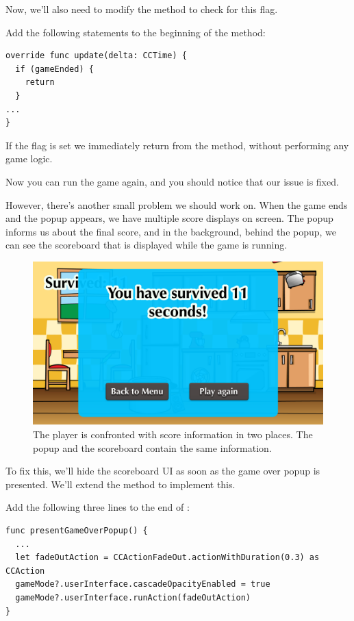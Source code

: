 Now, we'll also need to modify the  method to check for this
flag.
\begin{leftbar}
Add the following statements to the beginning of the 
method:
\begin{lstlisting}
override func update(delta: CCTime) {
  if (gameEnded) {
    return
  }
...
}
\end{lstlisting}
\end{leftbar}
If the  flag is set we immediately return from the
 method, without performing any game logic.

Now you can run the game again, and you should notice that our issue is fixed.

However, there's another small problem we should work on. When the game ends and
the popup appears, we have multiple score displays on screen. The popup informs
us about the final score, and in the background, behind the popup, we can see
the scoreboard that is displayed while the game is running.

\begin{figure}[H]
    \centering
    \includegraphics[width=0.75\linewidth]{images/Chapter7/no_ui_fadeout_popup.png}
    \caption{The player is confronted with score information in two places. The
    popup and the scoreboard contain the same information.}
\end{figure}

To fix this, we'll hide the scoreboard UI as soon as the game over popup is
presented. We'll extend the  method to
implement this.

\begin{leftbar}
Add the following three lines to the end of :
\begin{lstlisting}
func presentGameOverPopup() {
  ...  
  let fadeOutAction = CCActionFadeOut.actionWithDuration(0.3) as CCAction
  gameMode?.userInterface.cascadeOpacityEnabled = true
  gameMode?.userInterface.runAction(fadeOutAction)
}
\end{lstlisting}
\end{leftbar}


